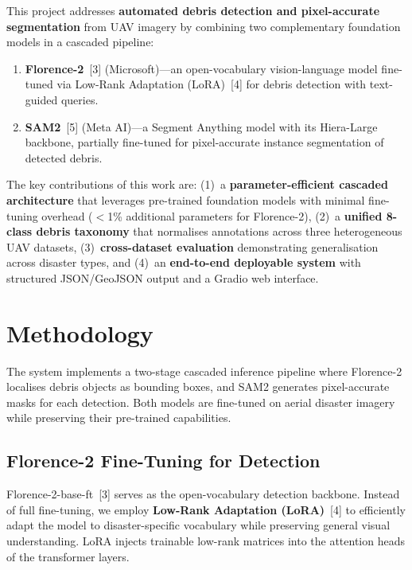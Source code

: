 \documentclass[10pt,a4paper,twocolumn]{article}
\begin{document}
This project addresses \textbf{automated debris detection and pixel-accurate segmentation} from UAV imagery by combining two complementary foundation models in a cascaded pipeline:

\begin{enumerate}
  \item \textbf{Florence-2}~[3] (Microsoft)---an open-vocabulary vision-language model fine-tuned via Low-Rank Adaptation (LoRA)~[4] for debris detection with text-guided queries.
  \item \textbf{SAM2}~[5] (Meta AI)---a Segment Anything model with its Hiera-Large backbone, partially fine-tuned for pixel-accurate instance segmentation of detected debris.
\end{enumerate}

The key contributions of this work are: (1)~a \textbf{parameter-efficient cascaded architecture} that leverages pre-trained foundation models with minimal fine-tuning overhead ($<$1\% additional parameters for Florence-2), (2)~a \textbf{unified 8-class debris taxonomy} that normalises annotations across three heterogeneous UAV datasets, (3)~\textbf{cross-dataset evaluation} demonstrating generalisation across disaster types, and (4)~an \textbf{end-to-end deployable system} with structured JSON/GeoJSON output and a Gradio web interface.


\section{Methodology}

The system implements a two-stage cascaded inference pipeline where Florence-2 localises debris objects as bounding boxes, and SAM2 generates pixel-accurate masks for each detection. Both models are fine-tuned on aerial disaster imagery while preserving their pre-trained capabilities.

\subsection{Florence-2 Fine-Tuning for Detection}

Florence-2-base-ft~[3] serves as the open-vocabulary detection backbone. Instead of full fine-tuning, we employ \textbf{Low-Rank Adaptation (LoRA)}~[4] to efficiently adapt the model to disaster-specific vocabulary while preserving general visual understanding. LoRA injects trainable low-rank matrices into the attention heads of the transformer layers.
\end{document}
